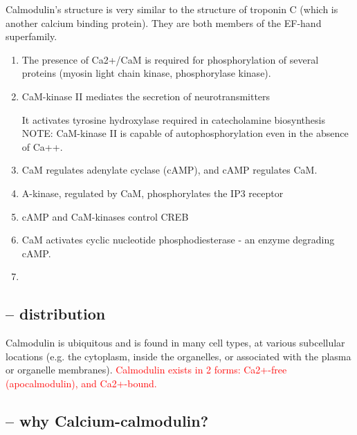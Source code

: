 Calmodulin's structure is very similar to the structure of troponin C (which is
another calcium binding protein). They are both members of the EF-hand
superfamily.

\begin{enumerate}
  \item  The presence of Ca2+/CaM is required for phosphorylation of several proteins
(myosin light chain kinase, phosphorylase kinase).

  \item CaM-kinase II mediates the secretion of neurotransmitters

It activates tyrosine hydroxylase required in catecholamine biosynthesis
NOTE: CaM-kinase II is capable of autophosphorylation even in the absence of
Ca++.
  
  \item  CaM regulates adenylate cyclase (cAMP), and cAMP regulates CaM. 
  
  \item A-kinase, regulated by CaM, phosphorylates the IP3 receptor
  
  \item  cAMP and CaM-kinases control CREB
  
  \item CaM activates cyclic nucleotide phosphodiesterase - an enzyme degrading
  cAMP. 
  
  \item 
\end{enumerate}

\subsection{-- distribution}

Calmodulin is ubiquitous and is found in many cell types, at various
subcellular locations (e.g. the cytoplasm, inside the organelles, or
associated with the plasma or organelle membranes).
\textcolor{red}{Calmodulin exists in 2 forms: Ca2+-free (apocalmodulin), and
Ca2+-bound.}


\subsection{-- why Calcium-calmodulin?}

